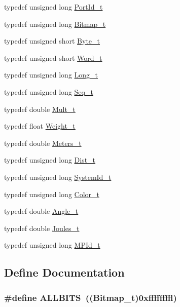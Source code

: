\begin{CompactItemize}
\item 
typedef unsigned long \hyperlink{common-defs_8hpp_86c518e080cd022223ea3a6b521f6d5d}{PortId\_\-t}
\item 
typedef unsigned long \hyperlink{common-defs_8hpp_e7a428d359769031670ad716f9182c17}{Bitmap\_\-t}
\item 
typedef unsigned short \hyperlink{common-defs_8hpp_6326115cea41e302927063216072e3a9}{Byte\_\-t}
\item 
typedef unsigned short \hyperlink{common-defs_8hpp_2faaec994dd9b0abd6e90d6aaa6c7c4d}{Word\_\-t}
\item 
typedef unsigned long \hyperlink{common-defs_8hpp_6d5c77eeb312c52c33f2e61f19b4cb5c}{Long\_\-t}
\item 
typedef unsigned long \hyperlink{common-defs_8hpp_3cfa4cbb39cc1d42ae586be87e656254}{Seq\_\-t}
\item 
typedef double \hyperlink{common-defs_8hpp_aa50d474d62a11178d02ca3d8a2af82e}{Mult\_\-t}
\item 
typedef float \hyperlink{common-defs_8hpp_d17b2eb8faf940e1065bcf4dfd4a183f}{Weight\_\-t}
\item 
typedef double \hyperlink{common-defs_8hpp_43389a05a56fa84a5e74e54a1fcebd91}{Meters\_\-t}
\item 
typedef unsigned long \hyperlink{common-defs_8hpp_fe0afe6b36e35e8d45006a657839c325}{Dist\_\-t}
\item 
typedef unsigned long \hyperlink{common-defs_8hpp_68053561cd6a94bd54c100e22bff9566}{SystemId\_\-t}
\item 
typedef unsigned long \hyperlink{common-defs_8hpp_f70bc9ff95ac0ba77c41c2781897885b}{Color\_\-t}
\item 
typedef double \hyperlink{common-defs_8hpp_65eb9e4da148e3744f9a3a9d3c3dc4bd}{Angle\_\-t}
\item 
typedef double \hyperlink{common-defs_8hpp_93dff162ebd5bf144310233559276f90}{Joules\_\-t}
\item 
typedef unsigned long \hyperlink{common-defs_8hpp_5dd53b5a388385a659ea00401af0378c}{MPId\_\-t}
\end{CompactItemize}


\subsection{Define Documentation}
\hypertarget{common-defs_8hpp_eef12456483291005b5a0a8e8d2c1256}{
\subsubsection[{ALLBITS}]{\setlength{\rightskip}{0pt plus 5cm}\#define ALLBITS~(({\bf Bitmap\_\-t})0xffffffffl)}}
\label{common-defs_8hpp_eef12456483291005b5a0a8e8d2c1256}


